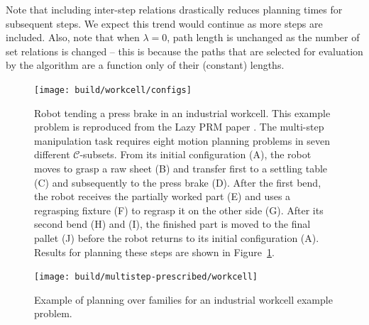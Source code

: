 Note that including inter-step relations drastically
reduces planning times for subsequent steps.
We expect this trend would continue as more steps are included.
Also, note that when $\lambda=0$,
path length is unchanged as the number of set relations is
changed
-- this is because the paths that are selected for evaluation
by the algorithm are a function only of their (constant) lengths.

\begin{figure}
   \centering
   \texttt{[image: build/workcell/configs]}
   \caption{Robot tending a press brake in an industrial workcell.
      This example problem is reproduced from the Lazy PRM paper
      \citep{bohlin2000lazyprm}.
      The multi-step manipulation task requires eight motion planning
      problems in seven different $\mathcal{C}$-subsets.
      From its initial configuration (A),
      the robot moves to grasp a raw sheet (B)
      and transfer first to a settling table (C)
      and subsequently to the press brake (D).
      After the first bend, the robot receives the partially worked
      part (E) and uses a regrasping fixture (F)
      to regrasp it on the other side (G).
      After its second bend (H) and (I),
      the finished part is moved to the final pallet (J)
      before the robot returns to its initial configuration (A).
      Results for planning these steps are shown in
      Figure~\ref{fig:family:workcell-pvx}.}
\end{figure}

\begin{figure}
   \centering
   \texttt{[image: build/multistep-prescribed/workcell]}
   \caption{Example of planning over families for an industrial
      workcell example problem.}
   \label{fig:family:workcell-pvx}
\end{figure}

